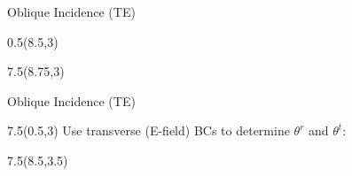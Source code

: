 \begin{lesson40}
\begin{frame}{Oblique Incidence (TE)}
\begin{textblock}{0.5}(8.5,3)
	{\color{Blue4}{\rule{1pt}{2.8in}}}
\end{textblock}


\begin{textblock}{7.5}(8.75,3)
\begin{small}
\end{small}

\end{textblock}
\end{frame}



\begin{frame}{Oblique Incidence (TE)}
\begin{textblock}{7.5}(0.5,3) 
Use transverse (E-field) BCs to determine $\theta^r$ and $\theta^t$:
\begin{small}
\end{small}
\end{textblock}


\begin{textblock}{7.5}(8.5,3.5)
\begin{small}
\end{small}
\end{textblock}
\end{frame}


\end{lesson40}
